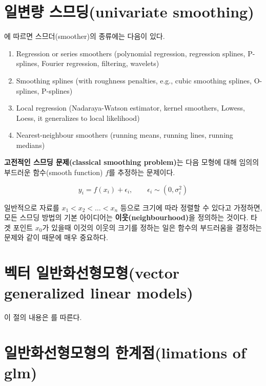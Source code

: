 \documentclass[b5paper,]{scrbook}
\theoremstyle{plain}
\theoremstyle{definition}
\numberwithin{equation}{section}
\begin{document}
\hypertarget{-univariate-smoothing}{%
\section{일변량 스므딩(univariate smoothing)}\label{-univariate-smoothing}}

\citep{Yee2015}에 따르면 스므더(smoother)의 종류에는 다음이 있다.

\begin{enumerate}
\def\labelenumi{\arabic{enumi}.}
\item
  Regression or series smoothers (polynomial regression, regression splines, P-splines, Fourier regression, filtering, wavelets)
\item
  Smoothing splines (with roughness penalties, e.g., cubic smoothing splines, O-splines, P-splines)
\item
  Local regression (Nadaraya-Watson estimator, kernel smoothers, Lowess, Loess, it generalizes to local likelihood)
\item
  Nearest-neighbour smoothers (running means, running lines, running medians)
\end{enumerate}

\textbf{고전적인 스므딩 문제(classical smoothing problem)}는 다음 모형에 대해 임의의 부드러운 함수(smooth function) \(f\)를 추정하는 문제이다.

\[y_{i}=f(x_{i})+\epsilon_{i}, \qquad{\epsilon_{i} \sim  (0, \sigma_{i}^{2})}\]

일반적으로 자료를 \(x_{1}<x_{2}<\ldots <x_{n}\) 등으로 크기에 따라 정렬할 수 있다고 가정하면, 모든 스므딩 방법의 기본 아이디어는 \textbf{이웃(neighbourhood)}을 정의하는 것이다. 타겟 포인트 \(x_{0}\)가 있을때 이것의 이웃의 크기를 정하는 일은 함수의 부드러움을 결정하는 문제와 같이 때문에 매우 중요하다.

\hypertarget{-vector-generalized-linear-models}{%
\section{벡터 일반화선형모형(vector generalized linear models)}\label{-vector-generalized-linear-models}}

이 절의 내용은 \citep{Yee2015}를 따른다.

\hypertarget{-limations-of-glm}{%
\section{일반화선형모형의 한계점(limations of glm)}\label{-limations-of-glm}}
\end{document}
